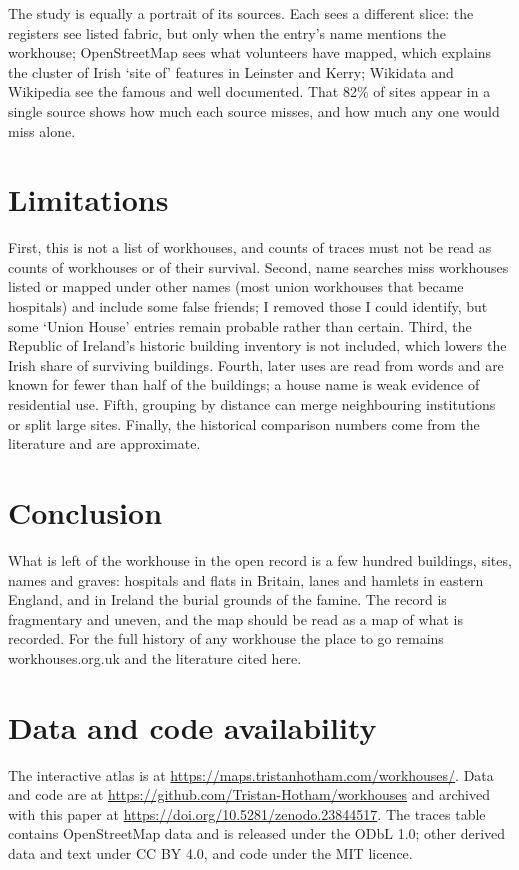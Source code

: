 \documentclass[11pt,a4paper]{article}
\begin{document}
The study is equally a portrait of its sources. Each sees a different slice: the registers see listed fabric, but only when the entry's name mentions the workhouse; OpenStreetMap sees what volunteers have mapped, which explains the cluster of Irish `site of' features in Leinster and Kerry; Wikidata and Wikipedia see the famous and well documented. That 82\% of sites appear in a single source shows how much each source misses, and how much any one would miss alone.

\section{Limitations}
First, this is not a list of workhouses, and counts of traces must not be read as counts of workhouses or of their survival. Second, name searches miss workhouses listed or mapped under other names (most union workhouses that became hospitals) and include some false friends; I removed those I could identify, but some `Union House' entries remain probable rather than certain. Third, the Republic of Ireland's historic building inventory is not included, which lowers the Irish share of surviving buildings. Fourth, later uses are read from words and are known for fewer than half of the buildings; a house name is weak evidence of residential use. Fifth, grouping by distance can merge neighbouring institutions or split large sites. Finally, the historical comparison numbers come from the literature and are approximate.

\section{Conclusion}
What is left of the workhouse in the open record is a few hundred buildings, sites, names and graves: hospitals and flats in Britain, lanes and hamlets in eastern England, and in Ireland the burial grounds of the famine. The record is fragmentary and uneven, and the map should be read as a map of what is recorded. For the full history of any workhouse the place to go remains workhouses.org.uk and the literature cited here.

\section*{Data and code availability}
The interactive atlas is at \url{https://maps.tristanhotham.com/workhouses/}. Data and code are at \url{https://github.com/Tristan-Hotham/workhouses} and archived with this paper at \url{https://doi.org/10.5281/zenodo.23844517}. The traces table contains OpenStreetMap data and is released under the ODbL 1.0; other derived data and text under CC BY 4.0, and code under the MIT licence.
\end{document}
